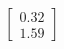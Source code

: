 \documentclass[preview]{standalone}
\begin{document}
\begin{align*}
\begin{bmatrix} 0.32 \\ 1.59 \end{bmatrix}
\end{align*}
\end{document}
